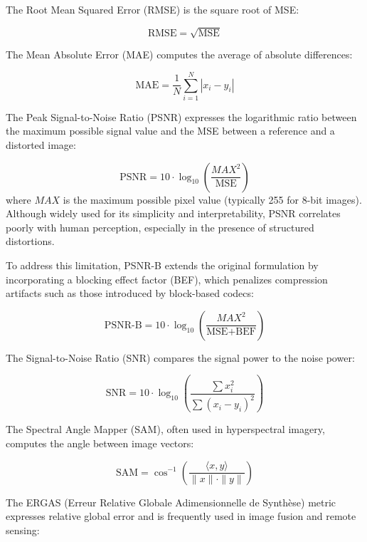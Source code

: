 The Root Mean Squared Error (RMSE) is the square root of MSE:\@

\begin{equation}
\text{RMSE} = \sqrt{\text{MSE}}
\end{equation}

The Mean Absolute Error (MAE) computes the average of absolute differences:

\begin{equation}
\text{MAE} = \frac{1}{N} \sum_{i=1}^{N} |x_i - y_i|
\end{equation}

The Peak Signal-to-Noise Ratio (PSNR) expresses the logarithmic ratio between the maximum possible signal value and the MSE between a reference and a distorted image:

\begin{equation}
\text{PSNR} = 10 \cdot \log_{10} \left( \frac{MAX^2}{\text{MSE}} \right)
\end{equation}
where $MAX$ is the maximum possible pixel value (typically 255 for 8-bit images). Although widely used for its simplicity and interpretability, PSNR correlates poorly with human perception, especially in the presence of structured distortions. 

To address this limitation, PSNR-B extends the original formulation by incorporating a blocking effect factor (BEF), which penalizes compression artifacts such as those introduced by block-based codecs:

\begin{equation}
\text{PSNR-B} = 10 \cdot \log_{10} \left( \frac{MAX^2}{\text{MSE} + \text{BEF}} \right)
\end{equation}

The Signal-to-Noise Ratio (SNR) compares the signal power to the noise power:

\begin{equation}
\text{SNR} = 10 \cdot \log_{10} \left( \frac{\sum x_i^2}{\sum {(x_i - y_i)}^2} \right)
\end{equation}

The Spectral Angle Mapper (SAM), often used in hyperspectral imagery, computes the angle between image vectors:

\begin{equation}
\text{SAM} = \cos^{-1} \left( \frac{\langle x, y \rangle}{\|x\| \cdot \|y\|} \right)
\end{equation}

The ERGAS (Erreur Relative Globale Adimensionnelle de Synthèse) metric expresses relative global error and is frequently used in image fusion and remote sensing:

